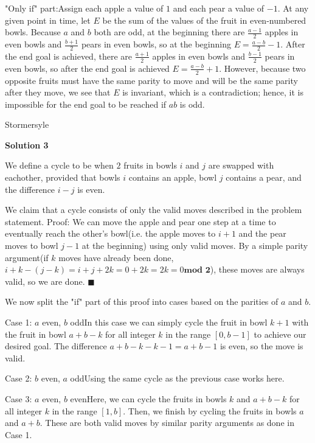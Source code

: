 \begin{enumerate}
 "Only if" part:Assign each apple a value of $1$ and each pear a value of $-1$. At any given point in time, let $E$ be the sum of the values of the fruit in even-numbered bowls. Because $a$ and $b$ both are odd, at the beginning there are $\frac{a-1}{2}$ apples in even bowls and $\frac{b+1}{2}$ pears in even bowls, so at the beginning $E=\frac{a-b}{2}-1$. After the end goal is achieved, there are $\frac{a+1}{2}$ apples in even bowls and $\frac{b-1}{2}$ pears in even bowls, so after the end goal is achieved $E=\frac{a-b}{2}+1$. However, because two opposite fruits must have the same parity to move and will be the same parity after they move, we see that $E$ is invariant, which is a contradiction; hence, it is impossible for the end goal to be reached if $ab$ is odd.

 Stormersyle

 



\textbf{Solution 3}

We define a cycle to be when $2$ fruits in bowls $i$ and $j$ are swapped with eachother, provided that bowls $i$ contains an apple, bowl $j$ contains a pear, and the difference $i-j$ is even. 

 We claim that a cycle consists of only the valid moves described in the problem statement. Proof: We can move the apple and pear one step at a time to eventually reach the other's bowl(i.e. the apple moves to $i+1$ and the pear moves to bowl $j-1$ at the beginning) using only valid moves. By a simple parity argument(if $k$ moves have already been done, $i+k-(j-k)=i+j+2k=0+2k=2k=0 \textbf{mod 2}$), these moves are always valid, so we are done. $\blacksquare$

 We now split the "if" part of this proof into cases based on the parities of $a$ and $b$. 

 Case 1: $a$ even, $b$ oddIn this case we can simply cycle the fruit in bowl $k+1$ with the fruit in bowl $a+b-k$ for all integer $k$ in the range $[0,b-1]$ to achieve our desired goal. The difference $a+b-k-k-1=a+b-1$ is even, so the move is valid.

 Case 2: $b$ even, $a$ oddUsing the same cycle as the previous case works here.

 Case 3: $a$ even, $b$ evenHere, we can cycle the fruits in bowls $k$ and $a+b-k$ for all integer $k$ in the range $[1,b]$. Then, we finish by cycling the fruits in bowls $a$ and $a+b$. These are both valid moves by similar parity arguments as done in Case 1. 


\end{enumerate}
